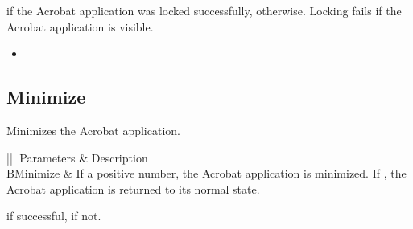 \documentclass[letterpaper,12pt,english,openany,oneside]{sphinxmanual}
\begin{document}

 if the Acrobat application was locked successfully,  otherwise. Locking fails if the Acrobat application is visible.

\label{\detokenize{IAC_API_OLE_Objects:related-methods-11}}
\begin{itemize}
\item {} 
 

\end{itemize}




\subsection{Minimize}
\label{\detokenize{IAC_API_OLE_Objects:minimize}}
Minimizes the Acrobat application.


\begin{sphinxVerbatim}[commandchars=\\\{\}]
  
\end{sphinxVerbatim}
\label{\detokenize{IAC_API_OLE_Objects:parameters-5}}


\begin{savenotes}\sphinxattablestart
\centering
{}\label{\detokenize{IAC_API_OLE_Objects:section-7}}\nobreak
\begin{tabular}[t]{|||}
\hline
\sphinxstyletheadfamily 
Parameters
&\sphinxstyletheadfamily 
Description
\\
\hline
BMinimize
&
If a positive number, the Acrobat application is minimized. If , the Acrobat application is returned to its normal state.
\\
\hline
\end{tabular}
\par
\sphinxattableend\end{savenotes}


 if successful,  if not.
\end{document}
